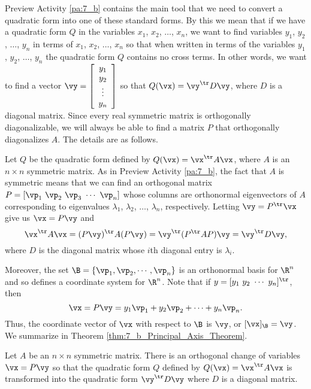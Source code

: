 Preview Activity \ref{pa:7_b} contains the main tool that we need to convert a quadratic form into one of these standard forms. By this we mean that if we have a quadratic form $Q$ in the variables $x_1$, $x_2$, $\ldots$, $x_n$, we want to find variables $y_1$, $y_2$, $\ldots$, $y_n$ in terms of $x_1$, $x_2$, $\ldots$, $x_n$ so that when written in terms of the variables $y_1$, $y_2$, $\ldots$, $y_n$ the quadratic form $Q$ contains no cross terms. In other words, we want to find a vector $\vy = \left[ \begin{array}{c} y_1 \\ y_2 \\ \vdots \\ y_n \end{array} \right]$ so that $Q(\vx) = \vy^{\tr} D \vy$, where $D$ is a diagonal matrix. Since every real symmetric matrix is orthogonally diagonalizable, we will always be able to find a matrix $P$ that orthogonally diagonalizes $A$.  The details are as follows. 

Let $Q$ be the quadratic form defined by $Q(\vx) = \vx^{\tr} A \vx$, where $A$ is an $n \times n$ symmetric matrix. As in Preview Activity \ref{pa:7_b}, the fact that $A$ is symmetric means that we can find an orthogonal matrix $P = [ \vp_1 \  \vp_2 \  \vp_3 \  \cdots \  \vp_n ]$ whose columns are orthonormal eigenvectors of $A$ corresponding to eigenvalues $\lambda_1$, $\lambda_2$, $\ldots$, $\lambda_n$, respectively. Letting $\vy = P^{\tr} \vx$ give us $\vx = P\vy$ and
\[\vx^{\tr} A \vx = (P\vy)^{\tr}A(P\vy) = \vy^{\tr}(P^{\tr}AP)\vy = \vy^{\tr} D \vy,\]
where $D$ is the diagonal matrix whose $i$th diagonal entry is $\lambda_i$.

Moreover, the set $\B = \{\vp_1, \vp_2, \cdots, \vp_n\}$ is an orthonormal basis for $\R^n$ and so defines a coordinate system for $\R^n$. Note that if $y = [y_1 \ y_2 \ \cdots \ y_n]^{\tr}$, then
\[\vx = P\vy = y_1\vp_1 + y_2 \vp_2 + \cdots + y_n \vp_n.\]
Thus, the coordinate vector of $\vx$ with respect to $\B$ is $\vy$, or $[\vx]_{\B} = \vy$. We summarize in Theorem \ref{thm:7_b_Principal_Axis_Theorem}. 

\begin{theorem} \label{thm:7_b_Principal_Axis_Theorem} Let $A$ be an $n \times n$ symmetric matrix. There is an orthogonal change of variables $\vx = P\vy$ so that the quadratic form $Q$ defined by $Q(\vx) = \vx^{\tr} A \vx$ is transformed into the quadratic form $\vy^{\tr} D \vy$ where $D$ is a diagonal matrix.
\end{theorem}

